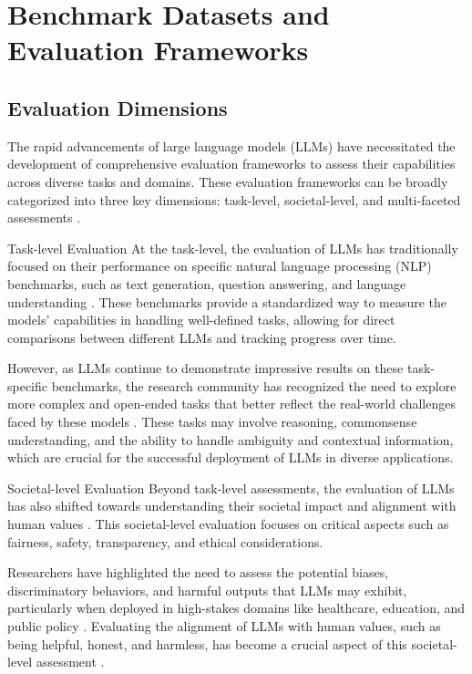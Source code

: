 \documentclass[11pt]{article}
\begin{document}
\section{Benchmark Datasets and Evaluation Frameworks}

\subsection{Evaluation Dimensions}

The rapid advancements of large language models (LLMs) have necessitated the development of comprehensive evaluation frameworks to assess their capabilities across diverse tasks and domains. These evaluation frameworks can be broadly categorized into three key dimensions: task-level, societal-level, and multi-faceted assessments \cite{ref61,ref53}.

Task-level Evaluation
At the task-level, the evaluation of LLMs has traditionally focused on their performance on specific natural language processing (NLP) benchmarks, such as text generation, question answering, and language understanding \cite{ref61,ref62}. These benchmarks provide a standardized way to measure the models' capabilities in handling well-defined tasks, allowing for direct comparisons between different LLMs and tracking progress over time.

However, as LLMs continue to demonstrate impressive results on these task-specific benchmarks, the research community has recognized the need to explore more complex and open-ended tasks that better reflect the real-world challenges faced by these models \cite{ref63,ref64}. These tasks may involve reasoning, commonsense understanding, and the ability to handle ambiguity and contextual information, which are crucial for the successful deployment of LLMs in diverse applications.

Societal-level Evaluation
Beyond task-level assessments, the evaluation of LLMs has also shifted towards understanding their societal impact and alignment with human values \cite{ref65,ref66}. This societal-level evaluation focuses on critical aspects such as fairness, safety, transparency, and ethical considerations.

Researchers have highlighted the need to assess the potential biases, discriminatory behaviors, and harmful outputs that LLMs may exhibit, particularly when deployed in high-stakes domains like healthcare, education, and public policy \cite{ref67,ref68}. Evaluating the alignment of LLMs with human values, such as being helpful, honest, and harmless, has become a crucial aspect of this societal-level assessment \cite{ref69}.
\end{document}
